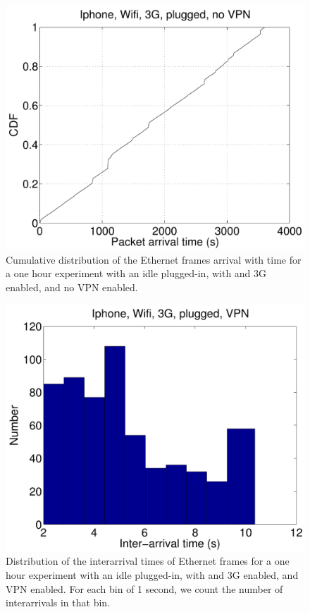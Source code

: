 \begin{figure}
\centering
        \includegraphics[width=0.8\linewidth]{../../code/pushNotification/Fig/bw_iphone_wifi_3g_plug_novpn_ts.pdf}
        \caption{Cumulative distribution of the Ethernet frames
          arrival with time for a one hour experiment with an idle
          \iphone{} plugged-in, with \wifi{} and 3G enabled, and no VPN
          enabled.}
  \label{fig:push_w3p_ts}
\end{figure}

\begin{figure}
\centering
        \includegraphics[width=0.8\linewidth]{../../code/pushNotification/Fig/bw_iphone_wifi_3g_plug_vpn_interTs.pdf}
  \caption{Distribution of the interarrival times of Ethernet frames
    for a one hour experiment with an idle \iphone{} plugged-in, with \wifi{} and 3G
    enabled, and VPN enabled. For each bin of 1 second, we count
    the number of interarrivals in that bin.}
  \label{fig:push_w3pv_interTs}
\end{figure}

